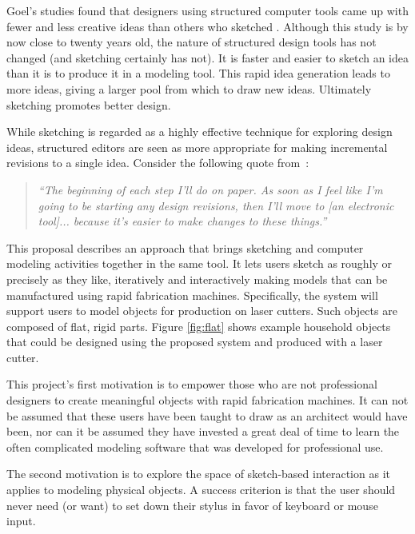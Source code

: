 \documentclass[11pt]{article}
\begin{document}
Goel's studies found that designers using structured computer tools
came up with fewer and less creative ideas than others who sketched
\cite{goel-sketches-of-thought}. Although this study is by now close
to twenty years old, the nature of structured design tools has not
changed (and sketching certainly has not). It is faster and easier to
sketch an idea than it is to produce it in a modeling tool. This rapid
idea generation leads to more ideas, giving a larger pool from which
to draw new ideas. Ultimately sketching promotes better design.

While sketching is regarded as a highly effective technique for
exploring design ideas, structured editors are seen as more
appropriate for making incremental revisions to a single
idea. Consider the following quote from~\cite{newman-web-designers}:

\begin{quotation}
\textit{``The beginning of each step I'll do on paper. As soon as I feel
  like I'm going to be starting any design revisions, then I'll move
  to [an electronic tool]... because it's easier to make changes to
  these things.''}
\end{quotation}

This proposal describes an approach that brings sketching and computer
modeling activities together in the same tool. It lets users sketch as
roughly or precisely as they like, iteratively and interactively
making models that can be manufactured using rapid fabrication
machines. Specifically, the system will support users to model objects
for production on laser cutters. Such objects are composed of flat,
rigid parts. Figure \ref{fig:flat} shows example household objects
that could be designed using the proposed system and produced with a
laser cutter.

This project's first motivation is to empower those who are not
professional designers to create meaningful objects with rapid
fabrication machines. It can not be assumed that these users have been
taught to draw as an architect would have been, nor can it be assumed
they have invested a great deal of time to learn the often complicated
modeling software that was developed for professional use. 

The second motivation is to explore the space of sketch-based
interaction as it applies to modeling physical objects. A success
criterion is that the user should never need (or want) to set down
their stylus in favor of keyboard or mouse input.
\end{document}

